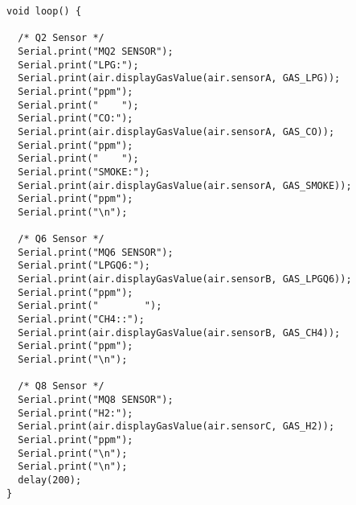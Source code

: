 \begin{lstlisting}
void loop() {

  /* Q2 Sensor */
  Serial.print("MQ2 SENSOR");
  Serial.print("LPG:");
  Serial.print(air.displayGasValue(air.sensorA, GAS_LPG));
  Serial.print("ppm");
  Serial.print("    ");
  Serial.print("CO:");
  Serial.print(air.displayGasValue(air.sensorA, GAS_CO));
  Serial.print("ppm");
  Serial.print("    ");
  Serial.print("SMOKE:");
  Serial.print(air.displayGasValue(air.sensorA, GAS_SMOKE));
  Serial.print("ppm");
  Serial.print("\n");

  /* Q6 Sensor */
  Serial.print("MQ6 SENSOR");
  Serial.print("LPGQ6:");
  Serial.print(air.displayGasValue(air.sensorB, GAS_LPGQ6));
  Serial.print("ppm");
  Serial.print("        ");
  Serial.print("CH4::");
  Serial.print(air.displayGasValue(air.sensorB, GAS_CH4));
  Serial.print("ppm");
  Serial.print("\n");

  /* Q8 Sensor */
  Serial.print("MQ8 SENSOR");
  Serial.print("H2:");
  Serial.print(air.displayGasValue(air.sensorC, GAS_H2));
  Serial.print("ppm");
  Serial.print("\n");
  Serial.print("\n");
  delay(200);
}
\end{lstlisting}

\newpage
